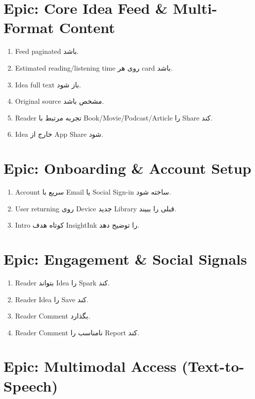 \section{Epic: Core Idea Feed \& Multi-Format Content}

\begin{enumerate}
  \item Feed paginated باشد. \eng{[NFR-02]}
  \item Estimated reading/listening time روی هر card باشد. \eng{[NFR-01]}
  \item Idea full text باز شود. \eng{[NFR-01]}
  \item Original source مشخص باشد. \eng{[NFR-08]}
  \item Reader تجربه مرتبط با Book/Movie/Podcast/Article را Share کند. \eng{[NFR-08]}
  \item Idea خارج از App Share شود. \eng{[NFR-08]}
\end{enumerate}

\section{Epic: Onboarding \& Account Setup}

\begin{enumerate}
  \item Account سریع با Email یا Social Sign-in ساخته شود. \eng{[NFR-09]}
  \item User returning روی Device جدید Library قبلی را ببیند. \eng{[NFR-05]}
  \item Intro کوتاه هدف InsightInk را توضیح دهد. \eng{[NFR-01]}
\end{enumerate}

\section{Epic: Engagement \& Social Signals}

\begin{enumerate}
  \item Reader بتواند Idea را Spark کند. \eng{[NFR-01]}
  \item Reader Idea را Save کند. \eng{[NFR-05]}
  \item Reader Comment بگذارد. \eng{[NFR-01]}
  \item Reader Comment نامناسب را Report کند. \eng{[NFR-15]}
\end{enumerate}

\section{Epic: Multimodal Access (Text-to-Speech)}

